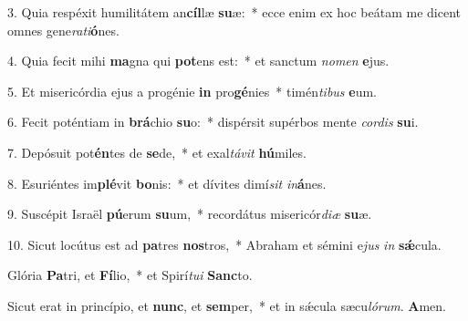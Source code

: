 3. Quia respéxit humilitátem an\textbf{cíl}læ \textbf{su}æ:~*
	ecce enim ex hoc beátam me dicent omnes gene\textit{ra}\textit{ti}\textbf{ó}nes.

4. Quia fecit mihi \textbf{ma}gna qui \textbf{pot}ens est:~*
	et sanctum \textit{no}\textit{men} \textbf{e}jus.

5. Et misericórdia ejus a progénie \textbf{in} pro\textbf{gé}nies~*
	timén\textit{ti}\textit{bus} \textbf{e}um.

6. Fecit poténtiam in \textbf{brá}chio \textbf{su}o:~*
	dispérsit supérbos mente \textit{cor}\textit{dis} \textbf{su}i.

7. Depósuit pot\textbf{én}tes de \textbf{se}de,~*
	et exal\textit{tá}\textit{vit} \textbf{hú}miles.

8. Esuriéntes im\textbf{plé}vit \textbf{bo}nis:~*
	et dívites dimí\textit{sit} \textit{in}\textbf{á}nes.

9. Suscépit Israël \textbf{pú}erum \textbf{su}um,~*
	recordátus misericór\textit{di}\textit{æ} \textbf{su}æ.

10. Sicut locútus est ad \textbf{pa}tres \textbf{nos}tros,~*
	Abraham et sémini e\textit{jus} \textit{in} \textbf{s\'{\ae}}cula.

Glória \textbf{Pa}tri, et \textbf{Fí}lio,~*
	et Spirí\textit{tu}\textit{i} \textbf{Sanc}to.

Sicut erat in princípio, et \textbf{nunc}, et \textbf{sem}per,~*
	et in s\'{\ae}cula sæcu\textit{ló}\textit{rum}. \textbf{A}men.